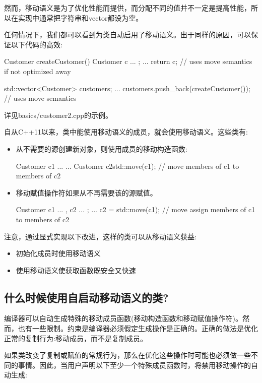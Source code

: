 然而，移动语义是为了优化性能而提供，而分配不同的值并不一定是提高性能，所以在实现中通常把字符串和vector都设为空。

任何情况下，我们都可以看到为类自动启用了移动语义。出于同样的原因，可以保证以下代码的高效:

\begin{cppcode}
Customer createCustomer()
{
	Customer c{ ... };
	...
	return c; // uses move semantics if not optimized away
}

std::vector<Customer> customers;
...
customers.push_back(createCustomer()); // uses move semantics
\end{cppcode}

详见basics/customer2.cpp的示例。

自从C++11以来，类中能使用移动语义的成员，就会使用移动语义。这些类有:

\begin{itemize}
	\item 从不需要的源创建新对象，则使用成员的移动构造函数:

	\begin{cppcode}
Customer c1{ ... }
...
Customer c2{std::move(c1)}; // move members of c1 to members of c2
	\end{cppcode}
	\item 移动赋值操作符如果从不再需要该的源赋值。

	\begin{cppcode}
Customer c1{ ... }, c2{ ... };
...
c2 = std::move(c1); // move assign members of c1 to members of c2
	\end{cppcode}
\end{itemize}

注意，通过显式实现以下改进，这样的类可以从移动语义获益:

\begin{itemize}
	\item 初始化成员时使用移动语义
	\item 使用移动语义使获取函数既安全又快速
\end{itemize}

\subsection{什么时候使用自启动移动语义的类?}

编译器可以自动生成特殊的移动成员函数(移动构造函数和移动赋值操作符)。然而，也有一些限制。约束是编译器必须假定生成操作是正确的。正确的做法是优化正常的复制行为:移动成员，而不是复制成员。

如果类改变了复制或赋值的常规行为，那么在优化这些操作时可能也必须做一些不同的事情。因此，当用户声明以下至少一个特殊成员函数时，将禁用移动操作的自动生成:

